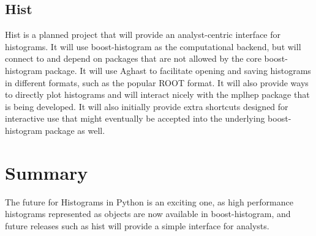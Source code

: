 \documentclass{webofc}
\begin{document}
\subsection{Hist}
\label{sec-hist}

Hist is a planned project that will provide an analyst-centric interface for histograms. It will use boost-histogram as the computational backend, but will connect to and depend on packages that are not allowed by the core boost-histogram package. It will use Aghast to facilitate opening and saving histograms in different formats, such as the popular ROOT format. It will also provide ways to directly plot histograms and will interact nicely with the mplhep package that is being developed. It will also initially provide extra shortcuts designed for interactive use that might eventually be accepted into the underlying boost-histogram package as well.


\section{Summary}
\label{sec-4}


The future for Histograms in Python is an exciting one, as high performance histograms represented as objects are now available in boost-histogram, and future releases such as hist will provide a simple interface for analysts.

% 
\end{document}
